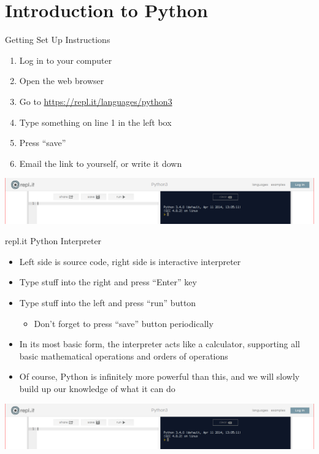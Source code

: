 \section{Introduction to Python}

\begin{frame}{Getting Set Up}
Instructions
\begin{enumerate}
  \item Log in to your computer
  \item Open the web browser
  \item Go to \url{https://repl.it/languages/python3}
  \item Type something on line 1 in the left box
  \item Press ``save''
  \item Email the link to yourself, or write it down
\end{enumerate}
\begin{center}
\includegraphics[scale=.2]{repl.png}
\end{center}
\end{frame}

\begin{frame}{repl.it Python Interpreter}
\begin{itemize}
\item Left side is source code, right side is interactive interpreter
\item Type stuff into the right and press ``Enter'' key
\item Type stuff into the left and press ``run'' button
  \begin{itemize}
    \item Don't forget to press ``save'' button periodically
  \end{itemize}
\item In its most basic form, the interpreter acts like a calculator, supporting all basic mathematical operations and orders of operations
\item Of course, Python is infinitely more powerful than this, and we will slowly build up our knowledge of what it can do
\end{itemize}
\begin{center}
\includegraphics[scale=.2]{repl.png}
\end{center}
\end{frame}

